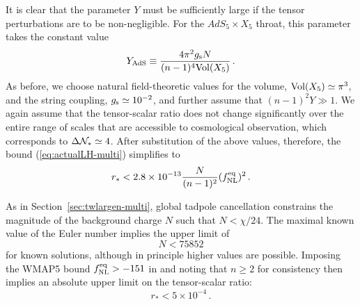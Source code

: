 It is clear that the parameter $Y$ 
must be sufficiently large if the tensor perturbations 
are to be non-negligible. For the $AdS_5 \times X_5$ throat, this parameter  
takes the constant value    
% 
\begin{equation}
\label{eq:YAds-multi}
Y_{\mathrm{AdS}} \equiv \frac{4\pi^2 g_\mathrm{s} N}{(n-1)^4 \mathrm{Vol} (X_5)} \,.
\end{equation}
% 
As before, we choose natural field-theoretic values for the volume, 
$\mathrm{Vol} (X_5) \simeq \pi^3$, and the string coupling, 
$g_\mathrm{s} \simeq 10^{-2}$, and further assume that 
$(n-1)^2 Y \gg 1$. 
We again assume that the tensor-scalar ratio does not change significantly
over the entire range of scales that are accessible to cosmological
observation, which corresponds to $\Delta \mathcal{N}_* \simeq 4$. 
After substitution of the above values, therefore, 
the bound (\ref{eq:actualLH-multi}) simplifies to
%  
\begin{equation}
\label{eq:AdSupper-multi}
r_* < 2.8 \times 10^{-13} \frac{N}{(n-1)^2} (f_{\mathrm{NL}}^{\mathrm{eq}})^2 \,.
\end{equation}
% 

As in Section~\ref{sec:twlargen-multi},
global tadpole cancellation constrains the magnitude of
the background charge $N$ such that $N < \chi /
24$. 
The maximal known value of the Euler number implies the upper limit of 
% 
\begin{equation}
\label{eq:Nlimit-multi} 
N < 75852
\end{equation}
% 
for known solutions, although in principle higher values are possible. 
Imposing the WMAP5 bound $f_{\mathrm{NL}}^{\mathrm{eq}}>-151$ in 
and noting that $n \ge 2$ for consistency then implies an absolute
upper limit 
on the tensor-scalar ratio:
%  
\begin{equation}
\label{eq:rupper-multi}
r_* < 5 \times 10^{-4} \, .
\end{equation}
% 


